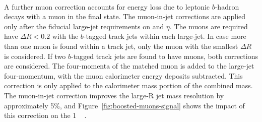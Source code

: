 \paragraph{}
A further muon correction accounts for energy loss due to leptonic $b$-hadron decays with a muon in the final state.
The muon-in-jet corrections are applied only after the fiducial large-\R jet requirements on \pt and $\eta$.
The muons are required have $\Delta R < 0.2$ with the $b$-tagged track jets within each large-\R jet. 
In case more than one muon is found within a track jet, only the muon with the smallest $\Delta R$ is considered. 
If two $b$-tagged track jets are found to have muons, both corrections are considered. 
The four-momenta of the matched muon is added to the large-\R jet four-momentum, with the muon calorimeter energy deposits subtracted. 
This correction is only applied to the calorimeter mass portion of the combined mass. 
The muon-in-jet correction improves the large-R jet mass resolution by approximately 5\%, and Figure~\ref{fig:boosted-muons-signal} shows the impact of this correction on the 1 \TeV~ \Grav.

